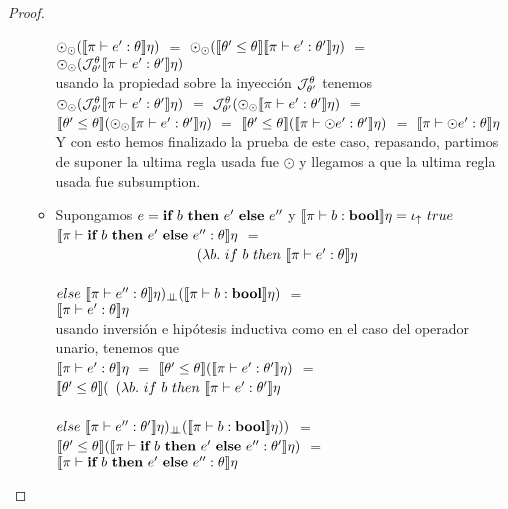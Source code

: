 \begin{proof}
\begin{itemize}
\begin{itemize}
$\odot_{\odot} (\llbracket \pi \vdash e' : \theta \rrbracket\eta)$ $=$
$\odot_{\odot} (\llbracket \theta' \leq \theta \rrbracket\llbracket \pi \vdash e' : \theta' \rrbracket\eta)$ $=$\\
$\odot_{\odot} (\mathcal{J}_{\theta'}^{\theta}\llbracket \pi \vdash e' : \theta' \rrbracket\eta)$\\

usando la propiedad sobre la inyecci\'on $\mathcal{J}_{\theta'}^{\theta}$ tenemos\\

$\odot_{\odot} (\mathcal{J}_{\theta'}^{\theta}\llbracket \pi \vdash e' : \theta' \rrbracket\eta)$ $=$
$\mathcal{J}_{\theta'}^{\theta}(\odot_{\odot} \llbracket \pi \vdash e' : \theta' \rrbracket\eta)$ $=$\\
$\llbracket \theta' \leq \theta \rrbracket(\odot_{\odot} \llbracket \pi \vdash e' : \theta' \rrbracket\eta)$ $=$
$\llbracket \theta' \leq \theta \rrbracket(\llbracket \pi \vdash \odot e' : \theta' \rrbracket\eta)$ $=$
$\llbracket \pi \vdash \odot e' : \theta \rrbracket\eta$\\

Y con esto hemos finalizado la prueba de este caso, repasando, partimos de suponer
la ultima regla usada fue $\odot$ y llegamos a que la ultima regla usada fue subsumption.

\item Supongamos $e = \textbf{if} \ b \ \textbf{then} \ e' \ \textbf{else} \ e''$ y 
$\semBrcks{\pi \vdash b : \boolt}\eta = \iotabot \ true$\\

$\llbracket \pi \vdash \textbf{if} \ b \ \textbf{then} \ e' \ \textbf{else} \ e'' : \theta \rrbracket\eta$ $=$\\
\indent \ \ \ \ \ \ \ \ \ \ \ \ \ \ \ \ \ \ \ \
$(\lambda b. \ if \ b \ then \ \semBrcks{\pi \vdash e' : \theta}\eta$\\
\indent \ \ \ \ \ \ \ \ \ \ \ \ \ \ \ \ \ \ \ \ \ \ \ \ \ \ \ \ \ \ \ \ \ \ \ \
$else \ \semBrcks{\pi \vdash e'' : \theta}\eta)_{\dbot} 
							(\semBrcks{\pi \vdash b : \boolt}\eta)$ $=$\\
$\llbracket \pi \vdash e' : \theta \rrbracket\eta$\\

usando inversi\'on e hip\'otesis inductiva como en el caso del operador unario, tenemos que\\

$\llbracket \pi \vdash e' : \theta \rrbracket\eta$ $=$ 
$\llbracket \theta' \leq \theta \rrbracket(\llbracket \pi \vdash e' : \theta' \rrbracket\eta)$ $=$\\
$\llbracket \theta' \leq \theta \rrbracket($
$(\lambda b. \ if \ b \ then \ \llbracket \pi \vdash e' : \theta' \rrbracket\eta$\\
\indent \ \ \ \ \ \ \ \ \ \ \ \ \ \ \ \ \ \ \ \ \ \ \ \ \ \ \ \ \ \ \ \
$else \ \semBrcks{\pi \vdash e'' : \theta'}\eta)_{\dbot} 
						(\semBrcks{\pi \vdash b : \boolt}\eta))$ $=$\\
$\llbracket \theta' \leq \theta \rrbracket
	(\llbracket \pi \vdash \textbf{if} \ b \ \textbf{then} \ e' \ \textbf{else} \ e'' : \theta' \rrbracket\eta)$ $=$\\
$\llbracket \pi \vdash \textbf{if} \ b \ \textbf{then} \ e' \ \textbf{else} \ e'' : \theta \rrbracket\eta$\\


\end{itemize}
\end{itemize}
\end{proof}
